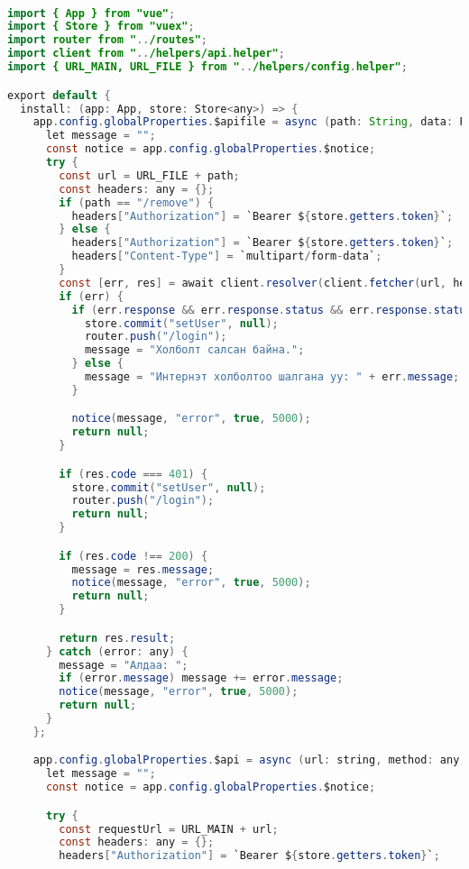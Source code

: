 \\ 
\begin{lstlisting}[language=java, caption=API дуудсан фунцаас ирсэн response дээр боловсруулалт хийх функц, frame=single]
import { App } from "vue";
import { Store } from "vuex";
import router from "../routes";
import client from "../helpers/api.helper";
import { URL_MAIN, URL_FILE } from "../helpers/config.helper";

export default {
  install: (app: App, store: Store<any>) => {
    app.config.globalProperties.$apifile = async (path: String, data: FormData) => {
      let message = "";
      const notice = app.config.globalProperties.$notice;
      try {
        const url = URL_FILE + path;
        const headers: any = {};
        if (path == "/remove") {
          headers["Authorization"] = `Bearer ${store.getters.token}`;
        } else {
          headers["Authorization"] = `Bearer ${store.getters.token}`;
          headers["Content-Type"] = `multipart/form-data`;
        }
        const [err, res] = await client.resolver(client.fetcher(url, headers, "post", data));
        if (err) {
          if (err.response && err.response.status && err.response.status === 401) {
            store.commit("setUser", null);
            router.push("/login");
            message = "Холболт салсан байна.";
          } else {
            message = "Интернэт холболтоо шалгана уу: " + err.message;
          }

          notice(message, "error", true, 5000);
          return null;
        }

        if (res.code === 401) {
          store.commit("setUser", null);
          router.push("/login");
          return null;
        }

        if (res.code !== 200) {
          message = res.message;
          notice(message, "error", true, 5000);
          return null;
        }

        return res.result;
      } catch (error: any) {
        message = "Алдаа: ";
        if (error.message) message += error.message;
        notice(message, "error", true, 5000);
        return null;
      }
    };

    app.config.globalProperties.$api = async (url: string, method: any, data = {}) => {
      let message = "";
      const notice = app.config.globalProperties.$notice;

      try {
        const requestUrl = URL_MAIN + url;
        const headers: any = {};
        headers["Authorization"] = `Bearer ${store.getters.token}`;


\end{lstlisting}
